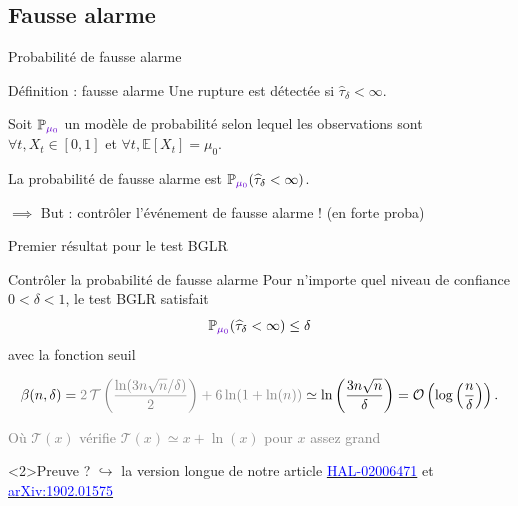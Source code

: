 \documentclass[11pt,french,ignorenonframetext,]{beamer}
\begin{document}
\subsection{\hfill{}Fausse alarme\hfill{}}

\begin{frame}{Probabilité de fausse alarme}


  \begin{block}{Définition : fausse alarme}
    Une rupture est détectée si $\widehat{\tau}_\delta < \infty$.
    \vspace*{10pt}

    Soit $\mathbb{P}_{\textcolor{deeppurple}{\mu_0}}$ un modèle de probabilité selon lequel les observations sont $\forall t, X_t \in[0,1]$
    et \textcolor{deeppurple}{$\forall t, \mathbb{E}[X_t] = \mu_0$}.
    \vspace*{10pt}

    La \alert{probabilité de fausse alarme} est $\mathbb{P}_{\textcolor{deeppurple}{\mu_0}}(\widehat{\tau}_\delta < \infty)$.
  \end{block}

  \alert{$\implies$ But : contrôler l'événement de fausse alarme !} (en forte proba)

\end{frame}

\begin{frame}{Premier résultat pour le test BGLR \dSmiley{}}

  \begin{block}{Contrôler la probabilité de fausse alarme}
    Pour n'importe quel \alert{niveau de confiance} $0<\delta<1$,
    le test BGLR satisfait
    \[ \mathbb{P}_{\textcolor{deeppurple}{\mu_0}}(\widehat{\tau}_\delta < \infty) \leq \delta \]
    avec la fonction seuil
    \begin{small}
      \[ \beta(n,\delta) = \textcolor{gray}{2\,\mathcal{T}\left(\frac{\ln(3n\sqrt{n}/\delta)}{2}\right) + 6\ln(1+\ln(n))} \simeq \ln\left(\frac{3n \sqrt{n}}{\delta}\right) = \mathcal{O}\left(\log\left(\frac{n}{\delta}\right)\right).\]
    \end{small}
    \begin{footnotesize}
      \textcolor{gray}{Où $\mathcal{T}(x)$ vérifie $\mathcal{T}(x)\simeq x + \ln(x)$ pour $x$ assez grand}
    \end{footnotesize}
  \end{block}

  \begin{small}
    \begin{exampleblock}<2>{Preuve ?}
      $\hookrightarrow$ la version longue de notre article
      \href{https://hal.inria.fr/hal-02006471}{\textcolor{blue}{HAL-02006471}}
      et
      \href{https://arxiv.org/abs/1902.01575}{\textcolor{blue}{arXiv:1902.01575}}
    \end{exampleblock}
  \end{small}

\end{frame}
\end{document}
